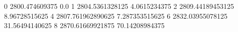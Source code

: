 0 2800.474609375 0.0
1 2804.5361328125 4.0615234375
2 2809.44189453125 8.96728515625
4 2807.761962890625 7.287353515625
6 2832.03955078125 31.56494140625
8 2870.61669921875 70.14208984375
